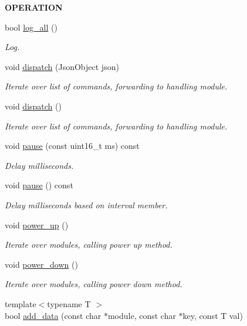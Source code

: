 \begin{Indent}{\bf O\+P\+E\+R\+A\+T\+I\+ON}
\begin{DoxyCompactItemize}
bool \hyperlink{class_loom_manager_af59e23602c123c36d4a855e6af6b4d75}{log\+\_\+all} ()
\begin{DoxyCompactList}\small\item\em Log. \end{DoxyCompactList}\item 
void \hyperlink{class_loom_manager_affe6f936dd6c9f7f8b489b03786ac83d}{dispatch} (Json\+Object json)
\begin{DoxyCompactList}\small\item\em Iterate over list of commands, forwarding to handling module. \end{DoxyCompactList}\item 
void \hyperlink{class_loom_manager_a80fb13974b3bde9b0cedcd43732d7226}{dispatch} ()
\begin{DoxyCompactList}\small\item\em Iterate over list of commands, forwarding to handling module. \end{DoxyCompactList}\item 
void \hyperlink{class_loom_manager_a3e57c97dd28717002cf11a1cff794239}{pause} (const uint16\+\_\+t ms) const 
\begin{DoxyCompactList}\small\item\em Delay milliseconds. \end{DoxyCompactList}\item 
void \hyperlink{class_loom_manager_a8d3dba74d36bf91a7356f08f0012268e}{pause} () const 
\begin{DoxyCompactList}\small\item\em Delay milliseconds based on interval member. \end{DoxyCompactList}\item 
void \hyperlink{class_loom_manager_abfb3562addd9910ef7957508d5552ea0}{power\+\_\+up} ()
\begin{DoxyCompactList}\small\item\em Iterate over modules, calling power up method. \end{DoxyCompactList}\item 
void \hyperlink{class_loom_manager_a1c7c446561067b986afc77ed1b4454c9}{power\+\_\+down} ()
\begin{DoxyCompactList}\small\item\em Iterate over modules, calling power down method. \end{DoxyCompactList}\item 
{\footnotesize template$<$typename T $>$ }\\bool \hyperlink{class_loom_manager_a4bfaf3aaf89df1f7c9cd8c2142c0cdfd}{add\+\_\+data} (const char $\ast$module, const char $\ast$key, const T val)

\end{DoxyCompactItemize}
\end{Indent}
